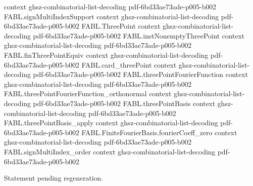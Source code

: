 \begin{theorem}
  {context}
  {ghsz-combinatorial-list-decoding}
  {pdf-6bd33ae73ade-p005-b002}
\proofstep
  {FABL.signMultiIndexSupport}
  {context}
  {ghsz-combinatorial-list-decoding}
  {pdf-6bd33ae73ade-p005-b002}
\proofstep
  {FABL.ThreePoint}
  {context}
  {ghsz-combinatorial-list-decoding}
  {pdf-6bd33ae73ade-p005-b002}
\proofstep
  {FABL.instNonemptyThreePoint}
  {context}
  {ghsz-combinatorial-list-decoding}
  {pdf-6bd33ae73ade-p005-b002}
\proofstep
  {FABL.finThreePointEquiv}
  {context}
  {ghsz-combinatorial-list-decoding}
  {pdf-6bd33ae73ade-p005-b002}
\proofstep
  {FABL.card_threePoint}
  {context}
  {ghsz-combinatorial-list-decoding}
  {pdf-6bd33ae73ade-p005-b002}
\proofstep
  {FABL.threePointFourierFunction}
  {context}
  {ghsz-combinatorial-list-decoding}
  {pdf-6bd33ae73ade-p005-b002}
\proofstep
  {FABL.threePointFourierFunction_orthonormal}
  {context}
  {ghsz-combinatorial-list-decoding}
  {pdf-6bd33ae73ade-p005-b002}
\proofstep
  {FABL.threePointBasis}
  {context}
  {ghsz-combinatorial-list-decoding}
  {pdf-6bd33ae73ade-p005-b002}
\proofstep
  {FABL.threePointBasis_apply}
  {context}
  {ghsz-combinatorial-list-decoding}
  {pdf-6bd33ae73ade-p005-b002}
\proofstep
  {FABL.FiniteFourierBasis.fourierCoeff_zero}
  {context}
  {ghsz-combinatorial-list-decoding}
  {pdf-6bd33ae73ade-p005-b002}
\proofstep
  {FABL.signMultiIndex_order}
  {context}
  {ghsz-combinatorial-list-decoding}
  {pdf-6bd33ae73ade-p005-b002}

Statement pending regeneration.
\end{theorem}

